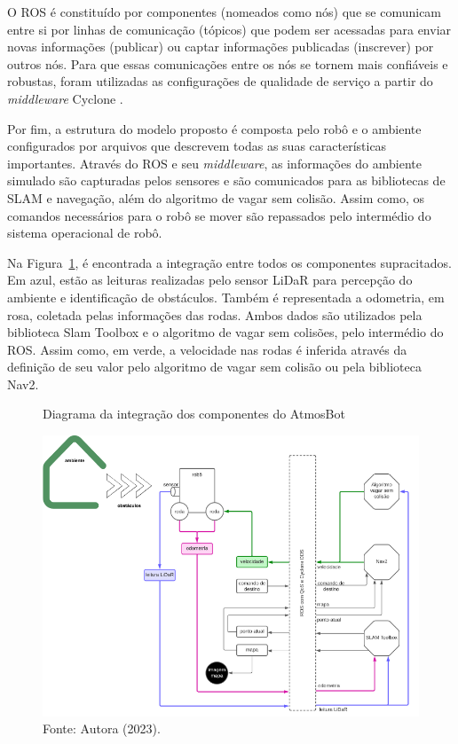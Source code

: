 O ROS é constituído por componentes (nomeados como nós) que se comunicam entre si por linhas de comunicação (tópicos) que podem ser acessadas para enviar novas informações (publicar) ou captar informações publicadas (inscrever) por outros nós. Para que essas comunicações entre os nós se tornem mais confiáveis e robustas, foram utilizadas as configurações de qualidade de serviço  a partir do \textit{middleware} Cyclone \cite{qos, cyclone}.

Por fim, a estrutura do modelo proposto é composta pelo robô e o ambiente configurados por arquivos que descrevem todas as suas características importantes. Através do ROS e seu \textit{middleware}, as informações do ambiente simulado são capturadas pelos sensores e são comunicados para as bibliotecas de SLAM e navegação, além do algoritmo de vagar sem colisão. Assim como, os comandos necessários para o robô se mover são repassados pelo intermédio do sistema operacional de robô.

Na Figura~\ref{fig:diagramaBlocosDetalhado}, é encontrada a integração entre todos os componentes supracitados. Em azul, estão as leituras realizadas pelo sensor LiDaR para percepção do ambiente e identificação de obstáculos. Também é representada a odometria, em rosa, coletada pelas informações das rodas. Ambos dados são utilizados pela biblioteca Slam Toolbox e o algoritmo de vagar sem colisões, pelo intermédio do ROS. Assim como, em verde, a velocidade nas rodas é inferida através da definição de seu valor pelo algoritmo de vagar sem colisão ou pela biblioteca Nav2.

\begin{figure}[h]
    \centering
    \caption{Diagrama da integração dos componentes do AtmosBot}
    \includegraphics[scale=0.6]{diagramaBlocosDetalhado.png}
    
    \caption*{Fonte: Autora (2023).}
    \label{fig:diagramaBlocosDetalhado}
\end{figure}